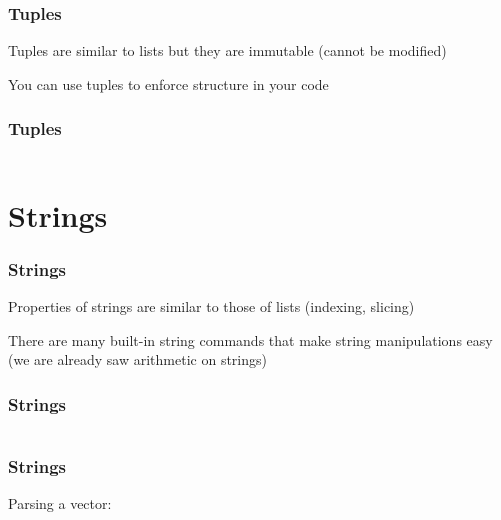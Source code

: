 \documentclass{beamer}
\begin{document}
\begin{frame}
\frametitle{Tuples}

Tuples are similar to lists but they are immutable (cannot be modified)

\vspace{0.1in}

You can use tuples to enforce structure in your code
\end{frame}

\begin{frame}
\frametitle{Tuples}

\begin{center}
\begin{tabular}{c}

\end{tabular}
\end{center}

\end{frame}

\section{Strings}

\begin{frame}
\frametitle{Strings}
Properties of strings are similar to those of lists (indexing, slicing)

\vspace{0.1in}

There are many built-in string commands that make string manipulations easy (we are already saw arithmetic on strings)

\end{frame}


\begin{frame}
\frametitle{Strings}

\begin{center}
\begin{tabular}{c}

\end{tabular}
\end{center}

\end{frame}

\begin{frame}
\frametitle{Strings}
Parsing a vector:
\begin{center}
\begin{tabular}{c}

\end{tabular}
\end{center}

\end{frame}
\end{document}
